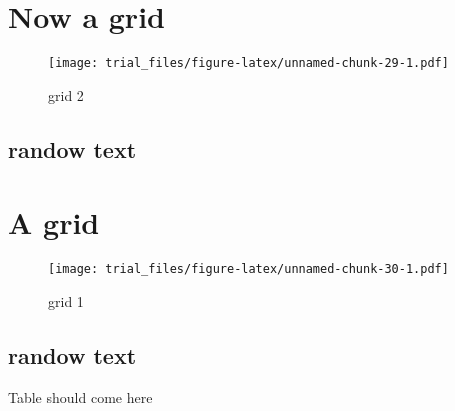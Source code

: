 \documentclass[]{article}
\begin{document}
\section{Now a grid}\label{now-a-grid-1}

\begin{figure}[htbp]
\centering
\texttt{[image: trial\_files/figure-latex/unnamed-chunk-29-1.pdf]}
\caption{grid 2}
\end{figure}

\subsection{randow text}\label{randow-text-15}

\lipsum

\section{A grid}\label{a-grid-7}

\begin{figure}[htbp]
\centering
\texttt{[image: trial\_files/figure-latex/unnamed-chunk-30-1.pdf]}
\caption{grid 1}
\end{figure}

\subsection{randow text}\label{randow-text-16}

\lipsum

Table should come here
\end{document}
